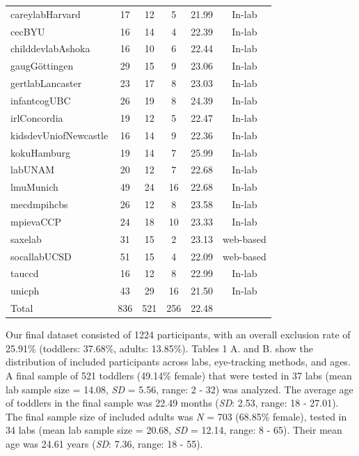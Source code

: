 \documentclass[
  english,
  man,floatsintext]{apa6}
\begin{document}
\begin{center}
\begin{ThreePartTable}
{\begin{longtable}{lccccc}
careylabHarvard & 17 & 12 & 5 & 21.99 & In-lab\\
cecBYU & 16 & 14 & 4 & 22.39 & In-lab\\
childdevlabAshoka & 16 & 10 & 6 & 22.44 & In-lab\\
gaugGöttingen & 29 & 15 & 9 & 23.06 & In-lab\\
gertlabLancaster & 23 & 17 & 8 & 23.03 & In-lab\\
infantcogUBC & 26 & 19 & 8 & 24.39 & In-lab\\
irlConcordia & 19 & 12 & 5 & 22.47 & In-lab\\
kidsdevUniofNewcastle & 16 & 14 & 9 & 22.36 & In-lab\\
kokuHamburg & 19 & 14 & 7 & 25.99 & In-lab\\
labUNAM & 20 & 12 & 7 & 22.68 & In-lab\\
lmuMunich & 49 & 24 & 16 & 22.68 & In-lab\\
mecdmpihcbs & 26 & 12 & 8 & 23.58 & In-lab\\
mpievaCCP & 24 & 18 & 10 & 23.33 & In-lab\\
saxelab & 31 & 15 & 2 & 23.13 & web-based\\
socallabUCSD & 51 & 15 & 4 & 22.09 & web-based\\
tauccd & 16 & 12 & 8 & 22.99 & In-lab\\
unicph & 43 & 29 & 16 & 21.50 & In-lab\\
Total & 836 & 521 & 256 & 22.48 & \\
\bottomrule
\end{longtable}

}

\end{ThreePartTable}
\end{center}

Our final dataset consisted of 1224 participants, with an overall exclusion rate of 25.91\% (toddlers: 37.68\%, adults: 13.85\%).
Tables 1 A. and B. show the distribution of included participants across labs, eye-tracking methods, and ages.
A final sample of 521 toddlers (49.14\% female) that were tested in 37 labs (mean lab sample size = 14.08, \emph{SD} = 5.56, range: 2 - 32) was analyzed.
The average age of toddlers in the final sample was 22.49 months (\emph{SD}: 2.53, range: 18 - 27.01).
The final sample size of included adults was \emph{N} = 703 (68.85\% female), tested in 34 labs (mean lab sample size = 20.68, \emph{SD} = 12.14, range: 8 - 65).
Their mean age was 24.61 years (\emph{SD}: 7.36, range: 18 - 55).
\end{document}
